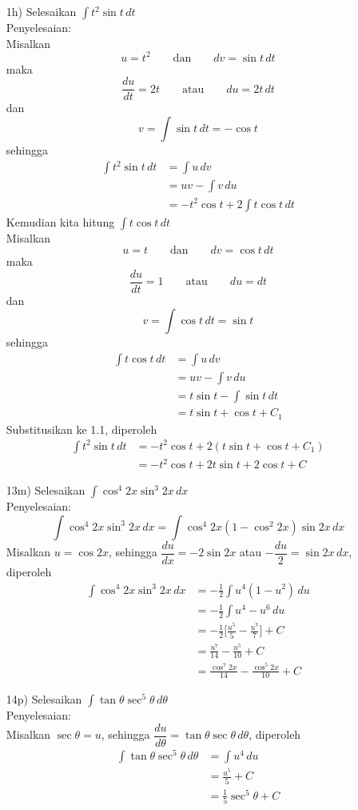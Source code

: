 \documentclass{article}
\begin{document}
\begin{enumerate}
	\item[1h)] Selesaikan \( \displaystyle \int t^2\sin t \, dt \) \\
	Penyelesaian: \\ 
	Misalkan \[u=t^2 \qquad \text{dan} \qquad dv=\sin t \, dt\]
	maka \[ \frac{du}{dt} = 2t \qquad \text{atau} \qquad du = 2t \, dt\]
	dan \[ v = \int \sin t \, dt = -\cos t\]
	sehingga
	\begin{align*}
	\int t^2\sin t \, dt &= \int u \, dv \\
	&= uv - \int v \, du \\
	&= -t^2\cos t + 2\int t\cos t \, dt \tag{1.1}
	\end{align*}
	Kemudian kita hitung \( \displaystyle \int t\cos t \, dt \) \\
	Misalkan \[ u=t \qquad \text{dan} \qquad dv=\cos t \, dt\]
	maka \[ \frac{du}{dt} = 1 \qquad \text{atau} \qquad du=dt\]
	dan \[ v = \int \cos t \, dt = \sin t\]
	sehingga
	\begin{align*}
	\int t\cos t \, dt &= \int u \, dv \\
	&= uv - \int v \, du \\
	&= t\sin t - \int \sin t \, dt \\
	&= t\sin t + \cos t + C_1
	\end{align*}
	Substitusikan ke 1.1, diperoleh 
	\begin{align*}
	\int t^2\sin t \, dt &= -t^2\cos t + 2(t\sin t + \cos t + C_1) \\
	&= -t^2\cos t + 2t\sin t + 2\cos t + C
	\end{align*}
\newpage
	\item[13m)] Selesaikan \(\displaystyle \int \cos^4 2x\sin^3 2x \, dx\) \\
	Penyelesaian: 
	\[\int \cos^4 2x\sin^3 2x \, dx = \int \cos^4 2x(1-\cos^2 2x)\sin 2x \, dx\]
	Misalkan $u=\cos 2x$, sehingga $\dfrac{du}{dx} = -2\sin 2x$ atau $-\dfrac{du}{2}=\sin 2x \, dx$, diperoleh
	\begin{align*}
	\int \cos^4 2x\sin^3 2x \, dx &= -\frac{1}{2} \int u^4(1-u^2) \, du \\
	&= -\frac{1}{2} \int u^4 - u^6 \, du \\
	&= -\frac{1}{2} \bigg[\frac{u^5}{5} - \frac{u^7}{7}\bigg] + C \\
	&= \frac{u^7}{14} - \frac{u^5}{10} + C \\
	&= \frac{\cos^7 2x}{14} - \frac{\cos^5 2x}{10} + C
	\end{align*}
	\item[14p)] Selesaikan \(\displaystyle \int \tan\theta\sec^5\theta \, d\theta\) \\
	Penyelesaian: \\
	Misalkan $\sec\theta = u$, sehingga $\dfrac{du}{d\theta} = \tan\theta\sec\theta \, d\theta$, diperoleh
	\begin{align*}
	\int \tan\theta\sec^5\theta \, d\theta &= \int u^4 \, du \\
	&= \frac{u^5}{5} + C \\
	&= \frac{1}{5}\sec^5\theta + C
	\end{align*}
\end{enumerate}
\newpage
\end{document}

